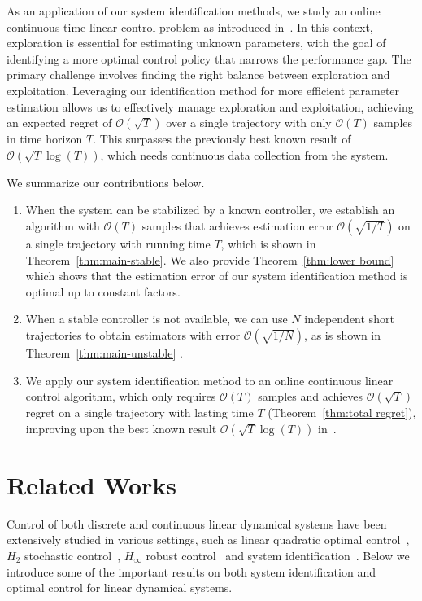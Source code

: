 \documentclass{article}
\theoremstyle{definition}
\begin{document}
As an application of our system identification methods, we study an online continuous-time linear control problem as introduced in~\citep{ref1}. In this context, exploration is essential for estimating unknown parameters, with the goal of identifying a more optimal control policy that narrows the performance gap. The primary challenge involves finding the right balance between exploration and exploitation. Leveraging our identification method for more efficient parameter estimation allows us to effectively manage exploration and exploitation, achieving an expected regret of $\mathcal{O}(\sqrt{T})$ over a single trajectory with only $\mathcal{O}(T)$ samples in time horizon $T$. This surpasses the previously best known result of $\mathcal{O}(\sqrt{T}\log(T))$, which needs continuous data collection from the system. 

We summarize our contributions below.
\begin{enumerate}
    \item When the system can be stabilized by a known controller, we establish an algorithm with $\mathcal{O}(T)$ samples that achieves estimation error $\mathcal{O}(\sqrt{1/T})$ on a single trajectory with running time $T$, which is shown in Theorem~\ref{thm:main-stable}. We also provide Theorem~\ref{thm:lower bound} which shows that the estimation error of our system identification method is optimal up to constant factors.
    \item When a stable controller is not available, we can use $N$ independent short trajectories to obtain estimators with error $\mathcal{O}(\sqrt{1/N})$, as is shown in Theorem~\ref{thm:main-unstable} .
    \item We apply our system identification method to an online continuous linear control algorithm, which only requires $\mathcal{O}(T)$ samples and achieves $\mathcal{O}(\sqrt{T})$ regret on a single trajectory with lasting time $T$ (Theorem~\ref{thm:total regret}), improving upon the best known result $\mathcal{O}(\sqrt{T}\log(T))$ in~\citep{ref1}.
\end{enumerate}

\section{Related Works}
Control of both discrete and continuous linear dynamical systems have been extensively studied in various settings, such as linear quadratic optimal control~\citep{ref16}, $H_{2}$ stochastic control~\citep{ref17}, $H_{\infty}$ robust control~\citep{ref18,ref19} and system identification~\citep{ref13,ref20}. Below we introduce some of the important results on both system identification and optimal control for linear dynamical systems.
\end{document}
